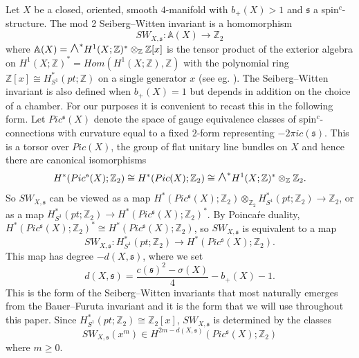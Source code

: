 \documentclass{amsart}
\theoremstyle{definition}
\theoremstyle{remark}
\numberwithin{equation}{section}
\newcommand{\largewedge}{\mbox{\Large $\wedge$}}
\begin{document}
Let $X$ be a closed, oriented, smooth $4$-manifold with $b_+(X)>1$ and $\mathfrak{s}$ a spin$^c$-structure. The mod 2 Seiberg--Witten invariant is a homomorphism
\[
SW_{X , \mathfrak{s}} : \mathbb{A}(X) \to \mathbb{Z}_2
\]
where $\mathbb{A}(X) = \largewedge^* H^1(X;\mathbb{Z})^*  \otimes_{\mathbb{Z}} \mathbb{Z}[x]$ is the tensor product of the exterior algebra on $H^1(X ; \mathbb{Z})^* = Hom( H^1(X ; \mathbb{Z}) , \mathbb{Z})$ with the polynomial ring $\mathbb{Z}[x] \cong H^*_{S^1}(pt ; \mathbb{Z})$ on a single generator $x$ (see eg. \cite{os}). The Seiberg--Witten invariant is also defined when $b_+(X)=1$ but depends in addition on the choice of a chamber. For our purposes it is convenient to recast this in the following form. Let $Pic^{\mathfrak{s}}(X)$ denote the space of gauge equivalence classes of spin$^c$-connections with curvature equal to a fixed $2$-form representing $-2\pi i c(\mathfrak{s})$. This is a torsor over $Pic(X)$, the group of flat unitary line bundles on $X$ and hence there are canonical isomorphisms
\[
H^*( Pic^{\mathfrak{s}}(X) ; \mathbb{Z}_2 ) \cong H^*( Pic(X) ; \mathbb{Z}_2 ) \cong {\largewedge}^* H^1(X ; \mathbb{Z})^* \otimes_{\mathbb{Z}} \mathbb{Z}_2.
\]
So $SW_{X,\mathfrak{s}}$ can be viewed as a map $H^*( Pic^{\mathfrak{s}}(X) ; \mathbb{Z}_2) \otimes_{\mathbb{Z}_2} H^*_{S^1}(pt ; \mathbb{Z}_2) \to \mathbb{Z}_2$, or as a map $H^*_{S^1}(pt ; \mathbb{Z}_2) \to H^*( Pic^\mathfrak{s}(X) ; \mathbb{Z}_2)^*$. By Poinca\'re duality, $H^*( Pic^\mathfrak{s}(X)  ; \mathbb{Z}_2)^* \cong H^*( Pic^\mathfrak{s}(X) ; \mathbb{Z}_2)$, so $SW_{X,\mathfrak{s}}$ is equivalent to a map
\[
SW_{X,\mathfrak{s}} : H^*_{S^1}(pt ; \mathbb{Z}_2) \to H^*( Pic^{\mathfrak{s}}(X) ; \mathbb{Z}_2).
\]
This map has degree $-d(X,\mathfrak{s})$, where we set
\[
d(X,\mathfrak{s}) =  \frac{ c(\mathfrak{s})^2 - \sigma(X)  }{4} - b_+(X) - 1.
\]
This is the form of the Seiberg--Witten invariants that most naturally emerges from the Bauer--Furuta invariant and it is the form that we will use throughout this paper. Since $H^*_{S^1}(pt ; \mathbb{Z}_2) \cong \mathbb{Z}_2[x]$, $SW_{X,\mathfrak{s}}$ is determined by the classes
\[
SW_{X,\mathfrak{s}}( x^m ) \in H^{2m - d(X,\mathfrak{s})}( Pic^{\mathfrak{s}}(X)  ; \mathbb{Z}_2)
\]
where $m \ge 0$.
\end{document}
